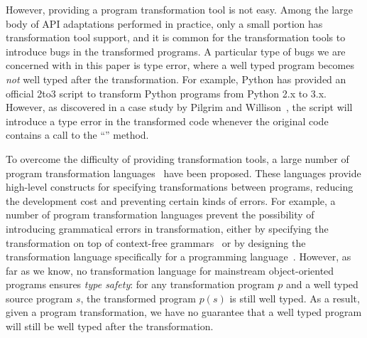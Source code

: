 However, providing a program transformation tool is not easy. Among
the large body of API adaptations performed in practice, only a small
portion has transformation tool support, and it is common for the
transformation tools to introduce bugs in the transformed programs. A
particular type of bugs we are concerned with in this paper is type error,
where a well typed program becomes \emph{not} well typed after the
transformation. For example, Python has provided an official 2to3
script to transform Python programs from Python 2.x to 3.x. However, as
discovered in a case study by Pilgrim and Willison~\cite{python}, the script will introduce a
type error in the transformed code whenever the original code contains a
call to the ``'' method.


To overcome the difficulty of providing transformation tools, a large
number of program transformation languages~\cite{twinning, txl, stratego, tom,
survey} have
been proposed. These languages provide high-level constructs for
specifying transformations between programs, reducing the development
cost and preventing certain kinds of errors. For example, a number of
program transformation languages prevent the possibility of
introducing grammatical errors in transformation, either by specifying
the transformation on top of context-free grammars~\cite{txl, stratego}
  or by designing the transformation language specifically for a
programming language~\cite{twinning}. However, as
far as we know, no transformation language for mainstream
object-oriented programs ensures \emph{type safety}: for any
transformation program $p$ and a well typed source program $s$, the
transformed program $p(s)$ is still well typed. As a result, given a
program transformation, we have no guarantee that a well typed
program will still be well typed after the transformation.

